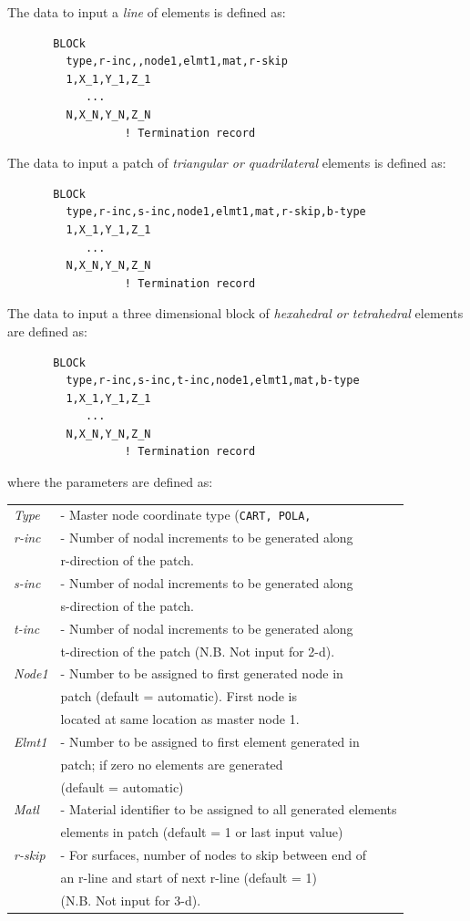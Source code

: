 The data to input a {\it line} of elements is defined as:
\begin{verbatim}
       BLOCk
         type,r-inc,,node1,elmt1,mat,r-skip
         1,X_1,Y_1,Z_1
            ...
         N,X_N,Y_N,Z_N
                  ! Termination record
\end{verbatim}
The data to input a patch of {\it triangular or quadrilateral}
elements is defined as:
\begin{verbatim}
       BLOCk
         type,r-inc,s-inc,node1,elmt1,mat,r-skip,b-type
         1,X_1,Y_1,Z_1
            ...
         N,X_N,Y_N,Z_N
                  ! Termination record
\end{verbatim}
The data to input a three dimensional block
of {\it hexahedral or tetrahedral} elements are defined as:
\begin{verbatim}
       BLOCk
         type,r-inc,s-inc,t-inc,node1,elmt1,mat,b-type
         1,X_1,Y_1,Z_1
            ...
         N,X_N,Y_N,Z_N
                  ! Termination record
\end{verbatim}
where the parameters are defined as:
\begin{center}
\begin{tabular}{l l}
\it Type  &- Master node coordinate type ({\tt CART, POLA,}\\
\it r-inc &- Number of nodal increments to be generated along \\
          &\quad r-direction of the patch. \\
\it s-inc & - Number of nodal increments to be generated along \\
          &\quad s-direction of the patch. \\
\it t-inc &- Number of nodal increments to be generated along \\
          &\quad t-direction of the patch (N.B. Not input for 2-d). \\
\it Node1 &- Number to be assigned to first generated node in \\
          &\quad patch (default = automatic).  First node is \\
          &\quad located at same location as master node 1. \\
\it Elmt1 &- Number to be assigned to first element generated in \\
          &\quad patch; if zero no elements are generated \\
          &\quad (default = automatic) \\
\it Matl  &- Material identifier to be assigned to all generated elements \\
          &\quad elements in patch (default = 1 or last input value) \\
\it r-skip &- For surfaces, number of nodes to skip between end of \\
          &\quad an r-line and start of next r-line (default = 1) \\
          &\quad (N.B. Not input for 3-d). \\
\end{tabular}
\end{center}


